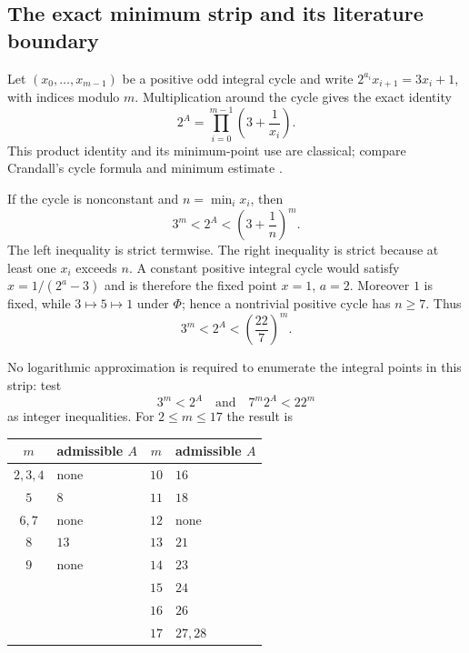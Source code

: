 \subsection{The exact minimum strip and its literature boundary}

Let $(x_0,\ldots,x_{m-1})$ be a positive odd integral cycle and write
$2^{a_i}x_{i+1}=3x_i+1$, with indices modulo $m$.  Multiplication around the
cycle gives the exact identity
\begin{equation}
 2^A=\prod_{i=0}^{m-1}\left(3+\frac1{x_i}\right).
 \label{eq:cycle-product-identity}
\end{equation}
This product identity and its minimum-point use are classical; compare
Crandall's cycle formula and minimum estimate
\cite[Section~7]{Crandall1978}.

If the cycle is nonconstant and $n=\min_i x_i$, then
\begin{equation}
 3^m<2^A<\left(3+\frac1n\right)^m.
 \label{eq:minimum-packet-strip}
\end{equation}
The left inequality is strict termwise.  The right inequality is strict
because at least one $x_i$ exceeds $n$.  A constant positive integral cycle
would satisfy $x=1/(2^a-3)$ and is therefore the fixed point $x=1$, $a=2$.
Moreover $1$ is fixed, while $3\mapsto5\mapsto1$ under $\Phi$; hence a
nontrivial positive cycle has $n\ge7$.  Thus
\begin{equation}
 3^m<2^A<\left(\frac{22}{7}\right)^m.
 \label{eq:seven-strip}
\end{equation}

No logarithmic approximation is required to enumerate the integral points in
this strip: test
\[
 3^m<2^A
 \quad\text{and}\quad
 7^m2^A<22^m
\]
as integer inequalities.  For $2\le m\le17$ the result is
\begin{center}
\begin{tabular}{c@{\qquad}l c@{\qquad}l}
\toprule
$m$ & admissible $A$ & $m$ & admissible $A$\\
\midrule
$2,3,4$ & none & $10$ & $16$\\
$5$ & $8$ & $11$ & $18$\\
$6,7$ & none & $12$ & none\\
$8$ & $13$ & $13$ & $21$\\
$9$ & none & $14$ & $23$\\
& & $15$ & $24$\\
& & $16$ & $26$\\
& & $17$ & $27,28$\\
\bottomrule
\end{tabular}
\end{center}


